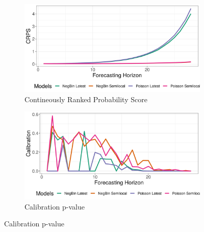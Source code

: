 \begin{figure}[H]
\begin{subfigure}{0.5\textwidth}
  \centering
  \includegraphics[width=\linewidth]{../output/Bunia_crps.png}  
  \caption{Contineously Ranked Probability Score}
  \label{Bunia_scores_1}
\end{subfigure}
\begin{subfigure}{0.5\textwidth}
  \centering
  \includegraphics[width=\linewidth]{../output/Bunia_calibration.png}  
  \caption{Calibration p-value}
  \label{Bunia_scores_2}
\end{subfigure}


\end{figure}

